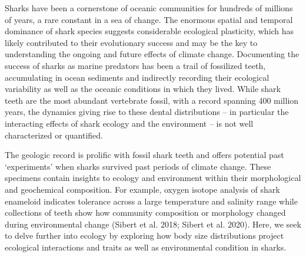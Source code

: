 \documentclass[]{rsos}%
\begin{document}
Sharks have been a cornerstone of oceanic communities for hundreds of millions of years, a rare constant in a sea of change.
The enormous spatial and temporal dominance of shark species suggests considerable ecological plasticity, which has likely contributed to their evolutionary success and may be the key to understanding the ongoing and future effects of climate change.
Documenting the success of sharks as marine predators has been a trail of fossilized teeth, accumulating in ocean sediments and indirectly recording their ecological variability as well as the oceanic conditions in which they lived.
While shark teeth are the most abundant vertebrate fossil, with a record spanning 400 million years, the dynamics giving rise to these dental distributions -- in particular the interacting effects of shark ecology and the environment -- is not well characterized or quantified.

The geologic record is prolific with fossil shark teeth and offers potential past ‘experiments’ when sharks survived past periods of climate change. 
These specimens contain insights to ecology and environment within their morphological and geochemical composition. 
For example, oxygen isotope analysis of shark enameloid indicates tolerance across a large temperature and salinity range \cite{Kim2014d, Kim2020}
while collections of teeth show how community composition or morphology changed during environmental change (Sibert et al. 2018; Sibert et al. 2020).
Here, we seek to delve further into ecology by exploring how body size distributions project ecological interactions and traits as well as environmental condition in sharks.
\end{document}
